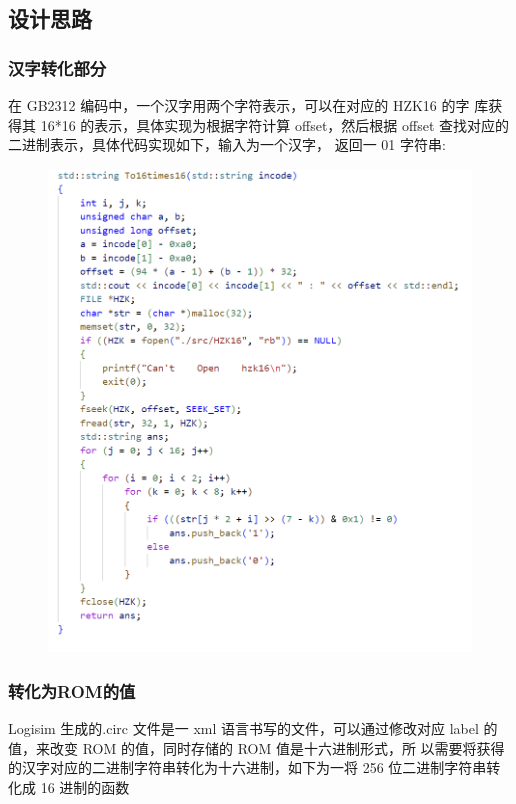 \documentclass{article}
\begin{document}
	\subsection{设计思路}
	\subsubsection{汉字转化部分}
	在 GB2312 编码中，一个汉字用两个字符表示，可以在对应的 HZK16 的字
	库获得其 16*16 的表示，具体实现为根据字符计算 offset，然后根据
	offset 查找对应的二进制表示，具体代码实现如下，输入为一个汉字，
	返回一 01 字符串:

	\begin{figure}[htbp]
		\centering
		\includegraphics[scale=0.8]{to16.png}
	\end{figure}

	\clearpage
	\subsubsection{转化为ROM的值}
	Logisim 生成的.circ 文件是一 xml 语言书写的文件，可以通过修改对应
	label 的值，来改变 ROM 的值，同时存储的 ROM 值是十六进制形式，所
	以需要将获得的汉字对应的二进制字符串转化为十六进制，如下为一将
	256 位二进制字符串转化成 16 进制的函数
	
\end{document}

